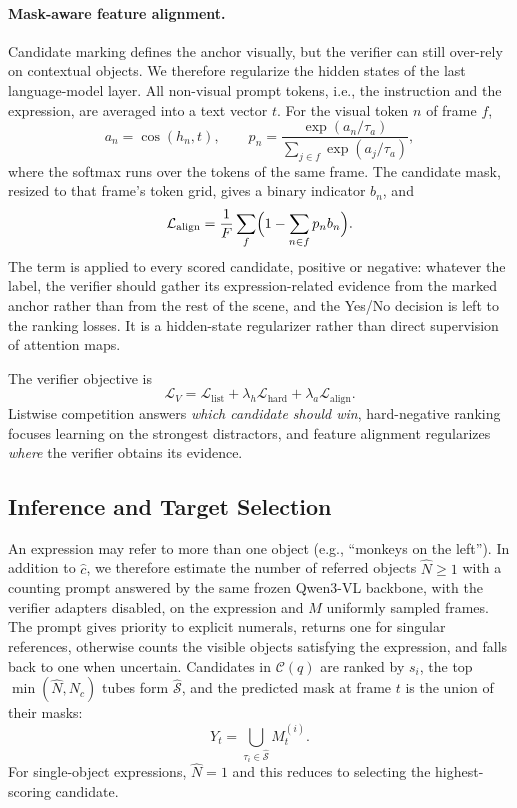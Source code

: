 \paragraph{Mask-aware feature alignment.}
Candidate marking defines the anchor visually, but the verifier can still over-rely on contextual objects. We therefore regularize the hidden states of the last language-model layer. All non-visual prompt tokens, i.e., the instruction and the expression, are averaged into a text vector $t$. For the visual token $n$ of frame $f$,
\begin{equation}
 a_n=\cos(h_n,t),
 \qquad
 p_n=
 \frac{\exp(a_n/\tau_a)}{\sum_{j\in f}\exp(a_j/\tau_a)},
\end{equation}
where the softmax runs over the tokens of the same frame. The candidate mask, resized to that frame's token grid, gives a binary indicator $b_n$, and
\begin{equation}
\mathcal{L}_{\mathrm{align}}
=
\frac{1}{F}\sum_{f}\Bigl(1-\sum_{n\in f} p_n b_n\Bigr).
\end{equation}
The term is applied to every scored candidate, positive or negative: whatever the label, the verifier should gather its expression-related evidence from the marked anchor rather than from the rest of the scene, and the Yes/No decision is left to the ranking losses. It is a hidden-state regularizer rather than direct supervision of attention maps.

The verifier objective is
\begin{equation}
\mathcal{L}_{V}
=
\mathcal{L}_{\mathrm{list}}
+
\lambda_h\mathcal{L}_{\mathrm{hard}}
+
\lambda_a\mathcal{L}_{\mathrm{align}}.
\end{equation}
Listwise competition answers \emph{which candidate should win}, hard-negative ranking focuses learning on the strongest distractors, and feature alignment regularizes \emph{where} the verifier obtains its evidence.

\subsection{Inference and Target Selection}
\label{sec:inference}
An expression may refer to more than one object (e.g., ``monkeys on the left''). In addition to $\hat c$, we therefore estimate the number of referred objects $\hat N\ge 1$ with a counting prompt answered by the same frozen Qwen3-VL backbone, with the verifier adapters disabled, on the expression and $M$ uniformly sampled frames. The prompt gives priority to explicit numerals, returns one for singular references, otherwise counts the visible objects satisfying the expression, and falls back to one when uncertain. Candidates in $\mathcal{C}(q)$ are ranked by $s_i$, the top $\min(\hat N,N_c)$ tubes form $\hat{\mathcal{S}}$, and the predicted mask at frame $t$ is the union of their masks:
\begin{equation}
Y_t=\bigcup_{\tau_i\in\hat{\mathcal{S}}} M_t^{(i)}.
\end{equation}
For single-object expressions, $\hat N=1$ and this reduces to selecting the highest-scoring candidate.
